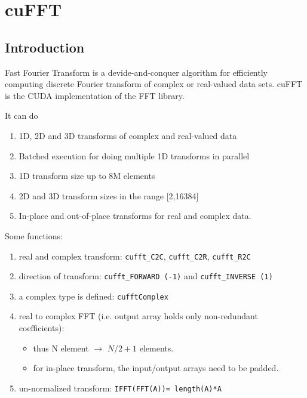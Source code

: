 
\chapter{cuFFT}
\label{chap:cufft}


\section{Introduction}
\label{sec:introduction-2}


Fast Fourier Transform is a devide-and-conquer algorithm for
efficiently computing discrete Fourier transform of complex or
real-valued data sets. cuFFT is the CUDA implementation of the FFT
library. 

It can do
\begin{enumerate}
\item 1D, 2D and 3D transforms of complex and real-valued data
\item Batched execution for doing multiple 1D transforms in parallel
\item 1D transform size up to 8M elements
\item 2D and 3D transform sizes in the range [2,16384]
\item In-place and out-of-place transforms for real and complex data.
\end{enumerate}

Some functions:
\begin{enumerate}
\item real and complex transform: \verb!cufft_C2C!, \verb!cufft_C2R!,
  \verb!cufft_R2C!
\item direction of transform: \verb!cufft_FORWARD (-1)! and
  \verb!cufft_INVERSE (1)!
\item a complex type is defined: \verb!cufftComplex!
\item real to complex FFT (i.e. output array holds only non-redundant
  coefficients): 
  \begin{itemize}
  \item thus N element $\rightarrow$ $N/2+1$ elements.
  \item for in-place transform, the input/output arrays need to be
    padded. 
  \end{itemize}
\item un-normalized transform: \verb!IFFT(FFT(A))= length(A)*A!
\end{enumerate}

